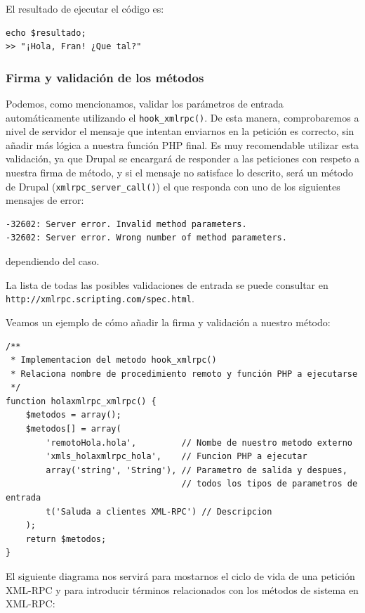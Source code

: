 El resultado de ejecutar el código es:

\begin{verbatim}
echo $resultado;
>> "¡Hola, Fran! ¿Que tal?"
\end{verbatim}

\subsubsection{Firma y validación de los métodos} 

Podemos, como mencionamos, validar los parámetros de entrada automáticamente utilizando el \verb|hook_xmlrpc()|. 
De esta manera, comprobaremos a nivel de servidor el mensaje que intentan enviarnos en la petición es correcto, sin 
añadir más lógica a nuestra función PHP final. Es muy recomendable utilizar esta validación, ya que Drupal 
se encargará de responder a las peticiones con respeto a nuestra firma de método, y si el mensaje no satisface 
lo descrito, será un método de Drupal (\verb|xmlrpc_server_call()|) el que responda con uno de los siguientes 
mensajes de error:
\begin{verbatim}
-32602: Server error. Invalid method parameters.
-32602: Server error. Wrong number of method parameters.
\end{verbatim}
dependiendo del caso.

La lista de todas las posibles validaciones de entrada se puede 
consultar en \verb|http://xmlrpc.scripting.com/spec.html|.

Veamos un ejemplo de cómo añadir la firma y validación a nuestro método:

\begin{verbatim}
/**
 * Implementacion del metodo hook_xmlrpc()
 * Relaciona nombre de procedimiento remoto y función PHP a ejecutarse
 */
function holaxmlrpc_xmlrpc() {
    $metodos = array();
    $metodos[] = array(
        'remotoHola.hola',         // Nombe de nuestro metodo externo
        'xmls_holaxmlrpc_hola',    // Funcion PHP a ejecutar
        array('string', 'String'), // Parametro de salida y despues, 
                                   // todos los tipos de parametros de entrada
        t('Saluda a clientes XML-RPC') // Descripcion
    );
    return $metodos;
}
\end{verbatim}

El siguiente diagrama nos servirá para mostarnos el ciclo de vida de una petición XML-RPC y para introducir términos 
relacionados con los métodos de sistema en XML-RPC:

